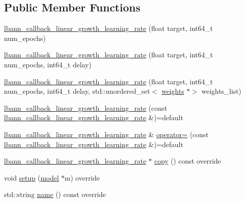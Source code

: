 \subsection*{Public Member Functions}
\begin{DoxyCompactItemize}
\item 
\hyperlink{classlbann_1_1lbann__callback__linear__growth__learning__rate_a9eb24d8032af168a0eeec7e385909d55}{lbann\+\_\+callback\+\_\+linear\+\_\+growth\+\_\+learning\+\_\+rate} (float target, int64\+\_\+t num\+\_\+epochs)
\item 
\hyperlink{classlbann_1_1lbann__callback__linear__growth__learning__rate_a288be0ef560e9169a634c2238b50370e}{lbann\+\_\+callback\+\_\+linear\+\_\+growth\+\_\+learning\+\_\+rate} (float target, int64\+\_\+t num\+\_\+epochs, int64\+\_\+t delay)
\item 
\hyperlink{classlbann_1_1lbann__callback__linear__growth__learning__rate_a2382f7efb2bfe8b58fd68450b569a519}{lbann\+\_\+callback\+\_\+linear\+\_\+growth\+\_\+learning\+\_\+rate} (float target, int64\+\_\+t num\+\_\+epochs, int64\+\_\+t delay, std\+::unordered\+\_\+set$<$ \hyperlink{classlbann_1_1weights}{weights} $\ast$$>$ weights\+\_\+list)
\item 
\hyperlink{classlbann_1_1lbann__callback__linear__growth__learning__rate_ab9b995df89c82e530d90b2fb0b8cbc2f}{lbann\+\_\+callback\+\_\+linear\+\_\+growth\+\_\+learning\+\_\+rate} (const \hyperlink{classlbann_1_1lbann__callback__linear__growth__learning__rate}{lbann\+\_\+callback\+\_\+linear\+\_\+growth\+\_\+learning\+\_\+rate} \&)=default
\item 
\hyperlink{classlbann_1_1lbann__callback__linear__growth__learning__rate}{lbann\+\_\+callback\+\_\+linear\+\_\+growth\+\_\+learning\+\_\+rate} \& \hyperlink{classlbann_1_1lbann__callback__linear__growth__learning__rate_acfc4f111a6a599f05523cde635cbbf6e}{operator=} (const \hyperlink{classlbann_1_1lbann__callback__linear__growth__learning__rate}{lbann\+\_\+callback\+\_\+linear\+\_\+growth\+\_\+learning\+\_\+rate} \&)=default
\item 
\hyperlink{classlbann_1_1lbann__callback__linear__growth__learning__rate}{lbann\+\_\+callback\+\_\+linear\+\_\+growth\+\_\+learning\+\_\+rate} $\ast$ \hyperlink{classlbann_1_1lbann__callback__linear__growth__learning__rate_aadb1266a360c5442e094113b919f6c13}{copy} () const override
\item 
void \hyperlink{classlbann_1_1lbann__callback__linear__growth__learning__rate_afaa81836e0dc1b6220212dad52df25fc}{setup} (\hyperlink{classlbann_1_1model}{model} $\ast$m) override
\item 
std\+::string \hyperlink{classlbann_1_1lbann__callback__linear__growth__learning__rate_a6080051bd4de75dc1ca3d927414d2455}{name} () const override
\end{DoxyCompactItemize}
